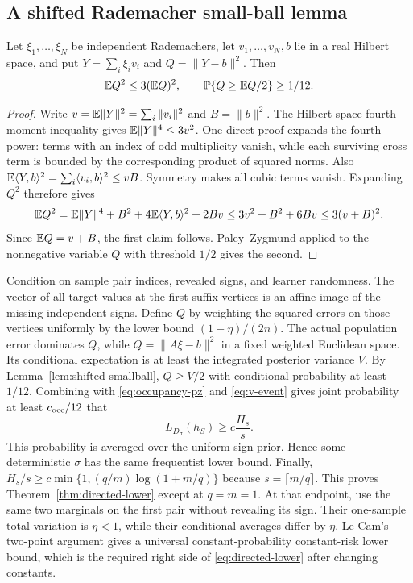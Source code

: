 \subsection{A shifted Rademacher small-ball lemma}

\begin{lemma}\label{lem:shifted-smallball}
Let $\xi_1,\ldots,\xi_N$ be independent Rademachers, let $v_1,\ldots,v_N,b$ lie in a real
Hilbert space, and put $Y=\sum_i\xi_iv_i$ and $Q=\|Y-b\|^2$. Then
\[
 \mathbb E Q^2\le3(\mathbb E Q)^2,
 \qquad
 \mathbb P\{Q\ge\mathbb E Q/2\}\ge1/12.
\]
\end{lemma}

\begin{proof}
Write $v=\mathbb E\|Y\|^2=\sum_i\|v_i\|^2$ and $B=\|b\|^2$. The Hilbert-space fourth-moment
inequality gives $\mathbb E\|Y\|^4\le3v^2$. One direct proof expands the fourth power: terms with an
index of odd multiplicity vanish, while each surviving cross term is bounded by the corresponding
product of squared norms. Also
$\mathbb E\langle Y,b\rangle^2=\sum_i\langle v_i,b\rangle^2\le vB$.
Symmetry makes all cubic terms vanish. Expanding $Q^2$ therefore gives
\[
 \mathbb E Q^2
 =\mathbb E\|Y\|^4+B^2+4\mathbb E\langle Y,b\rangle^2+2Bv
 \le3v^2+B^2+6Bv
 \le3(v+B)^2.
\]
Since $\mathbb E Q=v+B$, the first claim follows. Paley--Zygmund applied to the nonnegative variable
$Q$ with threshold $1/2$ gives the second.
\end{proof}

Condition on sample pair indices, revealed signs, and learner randomness. The vector of all target
values at the first suffix vertices is an affine image of the missing independent signs. Define $Q$
by weighting the squared errors on those vertices uniformly by the lower bound
$(1-\eta)/(2n)$. The actual population error dominates $Q$, while
$Q=\|A\xi-b\|^2$ in a fixed weighted Euclidean space. Its conditional expectation is at least the
integrated posterior variance $V$. By
Lemma~\ref{lem:shifted-smallball}, $Q\ge V/2$ with conditional probability at least $1/12$.
Combining with \eqref{eq:occupancy-pz} and \eqref{eq:v-event} gives joint probability at least
$c_{\rm occ}/12$ that
\[
 L_{D_\sigma}(h_S)\ge c\frac{H_s}{s}.
\]
This probability is averaged over the uniform sign prior. Hence some deterministic $\sigma$ has
the same frequentist lower bound. Finally,
$H_s/s\ge c\min\{1,(q/m)\log(1+m/q)\}$ because $s=\lceil m/q\rceil$. This proves
Theorem~\ref{thm:directed-lower} except at $q=m=1$. At that endpoint, use the same two marginals
on the first pair without revealing its sign. Their one-sample total variation is $\eta<1$, while
their conditional averages differ by $\eta$. Le Cam's two-point argument gives a universal
constant-probability constant-risk lower bound, which is the required right side of
\eqref{eq:directed-lower} after changing constants.

